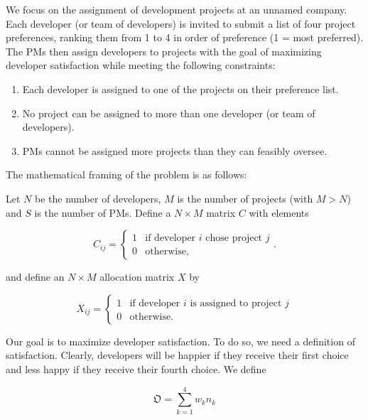 \documentclass[11pt]{article}
\providecommand{\tightlist}{%
      \setlength{\itemsep}{0pt}\setlength{\parskip}{0pt}}
\def\gt{>}
\begin{document}
We focus on the assignment of development projects at an unnamed
company. Each developer (or team of developers) is invited to submit a
list of four project preferences, ranking them from 1 to 4 in order of
preference (1 = most preferred). The PMs then assign developers to
projects with the goal of maximizing developer satisfaction while
meeting the following constraints: 

\begin{enumerate}
\def\labelenumi{\arabic{enumi}.}
\tightlist
\item
Each developer is assigned to one
of the projects on their preference list.
\item
No project can be assigned
to more than one developer (or team of developers). 
\item 
PMs cannot be
assigned more projects than they can feasibly oversee.
\end{enumerate}

The mathematical framing of the problem is as follows:

Let \(N\) be the number of developers, \(M\) is the number of projects
(with \(M \gt N\)) and \(S\) is the number of PMs. Define a
\(N \times M\) matrix \(C\) with elements


\begin{equation}\label{E:first}
C_{ij} = \begin{cases}
1 & \text{if developer $i$ chose project $j$} \\ 
0 & \text{otherwise}, 
\end{cases}.
\end{equation}


and define an \(N \times M\) allocation matrix \(X\) by

\begin{equation}\label{E:allocation}
X_{ij} =  \begin{cases}
1 & \text{if developer $i$ is assigned to project $j$} \\ 
0 & \text{otherwise.}
\end{cases}
\end{equation}


Our goal is to maximize developer satisfaction. To do so, we need a
definition of satisfaction. Clearly, developers will be happier if they
receive their first choice and less happy if they receive their fourth
choice. We define 

\begin{equation}\label{objective}
\mathfrak O = \sum_{k=1}^4 w_k n_k
\end{equation}
\end{document}
